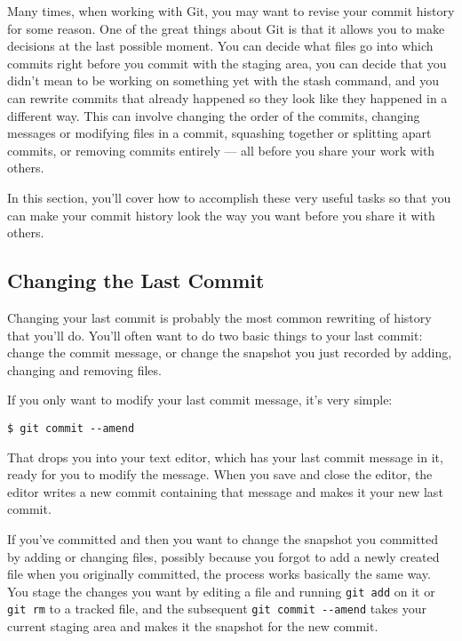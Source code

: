 \documentclass[a4paper]{book}
\begin{document}
Many times, when working with Git, you may want to revise your commit history for some reason. One of the great things about Git is that it allows you to make decisions at the last possible moment. You can decide what files go into which commits right before you commit with the staging area, you can decide that you didn't mean to be working on something yet with the stash command, and you can rewrite commits that already happened so they look like they happened in a different way. This can involve changing the order of the commits, changing messages or modifying files in a commit, squashing together or splitting apart commits, or removing commits entirely --- all before you share your work with others.

In this section, you'll cover how to accomplish these very useful tasks so that you can make your commit history look the way you want before you share it with others.

\subsection{Changing the Last Commit}

Changing your last commit is probably the most common rewriting of history that you'll do. You'll often want to do two basic things to your last commit: change the commit message, or change the snapshot you just recorded by adding, changing and removing files.

If you only want to modify your last commit message, it's very simple:

\begin{shaded}\begin{verbatim}
$ git commit --amend
\end{verbatim}\end{shaded}

That drops you into your text editor, which has your last commit message in it, ready for you to modify the message. When you save and close the editor, the editor writes a new commit containing that message and makes it your new last commit.

If you've committed and then you want to change the snapshot you committed by adding or changing files, possibly because you forgot to add a newly created file when you originally committed, the process works basically the same way. You stage the changes you want by editing a file and running \texttt{git add} on it or \texttt{git rm} to a tracked file, and the subsequent \texttt{git commit -{}-amend} takes your current staging area and makes it the snapshot for the new commit.
\end{document}
